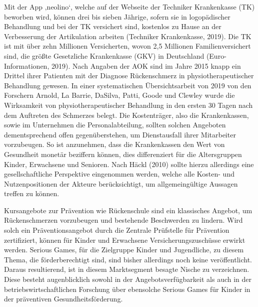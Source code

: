 \documentclass[
  a4paper,
  DIV=11,
  numbers=noendperiod,
  onecolumn,
  oneside,
  a4paper]{scrartcl}
\begin{document}
Mit der App ‚neolino`, welche auf der Webseite der Techniker
Krankenkasse (TK) beworben wird, können drei bis sieben Jährige, sofern
sie in logopädischer Behandlung und bei der TK versichert sind,
kostenlos zu Hause an der Verbesserung der Artikulation arbeiten
(Techniker Krankenkasse, 2019). Die TK ist mit über zehn Millionen
Versicherten, wovon 2,5 Millionen Familienversichert sind, die größte
Gesetzliche Krankenkasse (GKV) in Deutschland (Euro-Informationen,
2019). Nach Angaben der AOK sind im Jahre 2015 knapp ein Drittel ihrer
Patienten mit der Diagnose Rückenschmerz in physiotherapeutischer
Behandlung gewesen. In einer systematischen Übersichtsarbeit von 2019
von den Forschern Arnold, La Barrie, DaSilva, Patti, Goode und Clewley
wurde die Wirksamkeit von physiotherapeutischer Behandlung in den ersten
30 Tagen nach dem Auftreten des Schmerzes belegt. Die Kostenträger, also
die Krankenkassen, sowie im Unternehmen die Personalabteilung, sollten
solchen Angeboten dementsprechend offen gegenüberstehen, um
Dienstausfall ihrer Mitarbeiter vorzubeugen. So ist anzunehmen, dass die
Krankenkassen den Wert von Gesundheit monetär beziffern können, dies
differenziert für die Altersgruppen Kinder, Erwachsene und Senioren.
Nach Häckl (2010) sollte hierzu allerdings eine gesellschaftliche
Perspektive eingenommen werden, welche alle Kosten- und Nutzenpositionen
der Akteure berücksichtigt, um allgemeingültige Aussagen treffen zu
können.

Kursangebote zur Prävention wie Rückenschule sind ein klassisches
Angebot, um Rückenschmerzen vorzubeugen und bestehende Beschwerden zu
lindern. Wird solch ein Präventionsangebot durch die Zentrale Prüfstelle
für Prävention zertifiziert, können für Kinder und Erwachsene
Versicherungszuschüsse erwirkt werden. Serious Games, für die Zielgruppe
Kinder und Jugendliche, zu diesem Thema, die förderberechtigt sind, sind
bisher allerdings noch keine veröffentlicht. Daraus resultierend, ist in
diesem Marktsegment besagte Nische zu verzeichnen. Diese besteht
augenblicklich sowohl in der Angebotsverfügbarkeit als auch in der
betriebswirtschaftlichen Forschung über ebensolche Serious Games für
Kinder in der präventiven Gesundheitsförderung.
\end{document}
